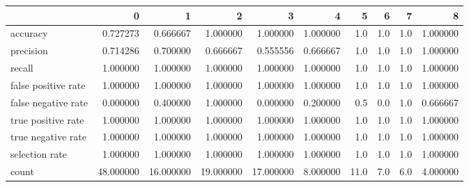 \begin{tabular}{lrrrrrrrrr}
\toprule
{} &          0 &          1 &          2 &          3 &         4 &     5 &    6 &    7 &         8 \\
\midrule
accuracy            &   0.727273 &   0.666667 &   1.000000 &   1.000000 &  1.000000 &   1.0 &  1.0 &  1.0 &  1.000000 \\
precision           &   0.714286 &   0.700000 &   0.666667 &   0.555556 &  0.666667 &   1.0 &  1.0 &  1.0 &  1.000000 \\
recall              &   1.000000 &   1.000000 &   1.000000 &   1.000000 &  1.000000 &   1.0 &  1.0 &  1.0 &  1.000000 \\
false positive rate &   1.000000 &   1.000000 &   1.000000 &   1.000000 &  1.000000 &   1.0 &  1.0 &  1.0 &  1.000000 \\
false negative rate &   0.000000 &   0.400000 &   1.000000 &   0.000000 &  0.200000 &   0.5 &  0.0 &  1.0 &  0.666667 \\
true positive rate  &   1.000000 &   1.000000 &   1.000000 &   1.000000 &  1.000000 &   1.0 &  1.0 &  1.0 &  1.000000 \\
true negative rate  &   1.000000 &   1.000000 &   1.000000 &   1.000000 &  1.000000 &   1.0 &  1.0 &  1.0 &  1.000000 \\
selection rate      &   1.000000 &   1.000000 &   1.000000 &   1.000000 &  1.000000 &   1.0 &  1.0 &  1.0 &  1.000000 \\
count               &  48.000000 &  16.000000 &  19.000000 &  17.000000 &  8.000000 &  11.0 &  7.0 &  6.0 &  4.000000 \\
\bottomrule
\end{tabular}
